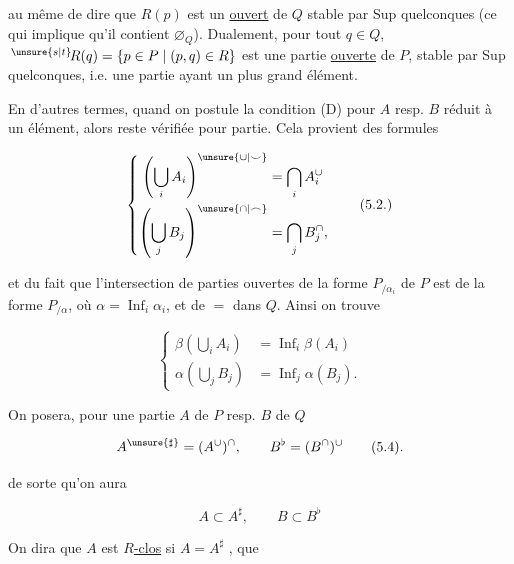 
au même de dire que $R(p)$ est un \uline{ouvert} de $Q$ stable par Sup quelconques (ce qui implique qu'il contient $\varnothing_Q$). Dualement, pour tout $q\in Q$, $\,{}^{\unsure{s|t}}\!R(q)=\{p\in P\mid(p,q)\in R\}$ est une partie \uline{ouverte} de $P$, stable par Sup quelconques, i.e. une partie   ayant un plus grand élément.

En d'autres termes, quand on postule la condition (D) pour $A$ resp. $B$ réduit à un élément, alors  reste vérifiée pour  partie. Cela provient des  formules

\[
\left\{\begin{aligned}
 \left(\bigcup_i A_i\right)^{\unsure{\cup|\smile}}&=\bigcap_i A_i^\cup\\
 \left(\bigcup_j B_j\right)^{\unsure{\cap|\frown}}&=\bigcap_j B_j^\cap,
\end{aligned}\right.
\tag*{(5.2.)}
\]

et du fait que l'intersection de parties ouvertes de la forme $P_{/\alpha_i}$ de $P$ est de la forme $P_{/\alpha}$, où $\alpha=\mathop{\mathrm{Inf}}_i\alpha_i$, et de $=$ dans $Q$. Ainsi on trouve

\[
\left\{\begin{aligned}
 \beta\left(\bigcup_i A_i\right)&=\mathop{\mathrm{Inf}}_i\beta(A_i)\\
 \alpha\left(\bigcup_j B_j\right)&=\mathop{\mathrm{Inf}}_j\alpha(B_j).
\end{aligned}\right.
\tag*{(5.3.)}
\]

On posera, pour une partie $A$ de $P$ resp. $B$ de $Q$

\[
 A^{\unsure{\sharp}}=(A^\cup)^\cap,\qquad B^\flat=(B^\cap)^\cup
\tag*{(5.4).}
\]

 de sorte qu'on aura

\[
 A\subset A^\sharp,\qquad B\subset B^\flat
\tag*{(5.5.)}
\]



On dira que $A$ est \uline{$R$-clos} si $A=A^\sharp$ , que
